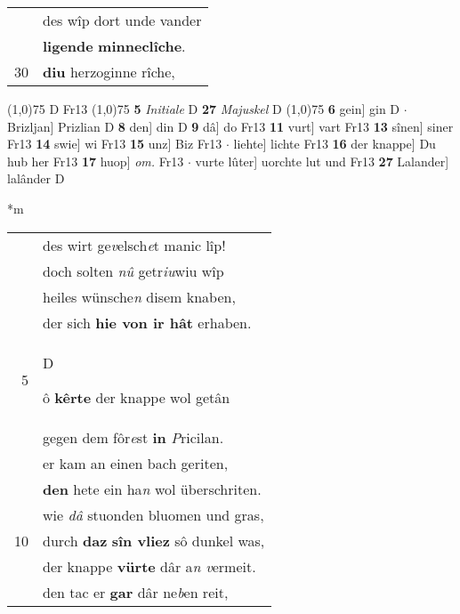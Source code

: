 \documentclass[8pt,a4paper,notitlepage]{article}
\begin{document}
\begin{table}[ht]
\begin{minipage}[t]{0.5\linewidth}
\begin{tabular}{rl}
 & des wîp dort unde vander\\ 
 & \textbf{ligende} \textbf{minneclîche}.\\ 
30 & \textbf{diu} herzoginne rîche,\\ 
\end{tabular}
\scriptsize
\line(1,0){75} \newline
D Fr13 \newline
\line(1,0){75} \newline
\textbf{5} \textit{Initiale} D  \textbf{27} \textit{Majuskel} D  \newline
\line(1,0){75} \newline
\textbf{6} gein] gin D  $\cdot$ Brizljan] Prizlian D \textbf{8} den] din D \textbf{9} dâ] do Fr13 \textbf{11} vurt] vart Fr13 \textbf{13} sînen] siner Fr13 \textbf{14} swie] wi Fr13 \textbf{15} unz] Biz Fr13  $\cdot$ liehte] lichte Fr13 \textbf{16} der knappe] Du hub her Fr13 \textbf{17} huop] \textit{om.} Fr13  $\cdot$ vurte lûter] uorchte lut und Fr13 \textbf{27} Lalander] lalânder D \newline
\end{minipage}
\hspace{0.5cm}
\begin{minipage}[t]{0.5\linewidth}
\small
\begin{center}*m
\end{center}
\begin{tabular}{rl}
 & des wirt ge\textit{v}elsch\textit{e}t manic lîp!\\ 
 & doch solten \textit{nû} getr\textit{iu}wiu wîp\\ 
 & heiles wünsche\textit{n} disem knaben,\\ 
 & der sich \textbf{hie von ir hât} erhaben.\\ 
5 & \begin{large}D\end{large}ô \textbf{kêrte} der knappe wol getân\\ 
 & gegen dem fôr\textit{e}st \textbf{in} \textit{P}ricilan.\\ 
 & er kam an einen bach geriten,\\ 
 & \textbf{den} hete ein ha\textit{n} wol überschriten.\\ 
 & wie \textit{dâ} stuonden bluomen und gras,\\ 
10 & durch \textbf{daz} \textbf{sîn vliez} sô dunkel was,\\ 
 & der knappe \textbf{vürte} dâr a\textit{n v}ermeit.\\ 
 & den tac er \textbf{gar} dâr ne\textit{b}en reit,\\ 

\end{tabular}
\end{minipage}
\end{table}
\end{document}
